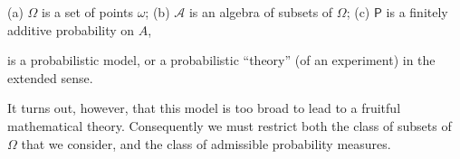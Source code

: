 (a) $\Omega$ is a set of points $\omega$;
(b) $\mathcal{A}$ is an algebra of subsets of $\Omega$;
(c) $\mathsf{P}$ is a finitely additive probability on $A$,

is a probabilistic model, or a probabilistic “theory” (of an experiment) in the extended sense.

It turns out, however, that this model is too broad to lead to a fruitful mathematical theory. Consequently we must restrict both the class of subsets of $\Omega$ that we consider, and the class of admissible probability measures.

